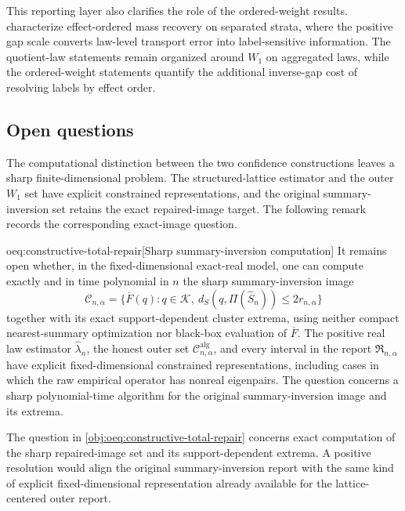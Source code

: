 This reporting layer also clarifies the role of the ordered-weight results.  characterize effect-ordered mass recovery on separated strata, where the positive gap scale converts law-level transport error into label-sensitive information. The quotient-law statements remain organized around \(W_1\) on aggregated laws, while the ordered-weight statements quantify the additional inverse-gap cost of resolving labels by effect order.

\subsection{Open questions}

The computational distinction between the two confidence constructions leaves a sharp finite-dimensional problem. The structured-lattice estimator and the outer \(W_1\) set have explicit constrained representations, and the original summary-inversion set retains the exact repaired-image target. The following remark records the corresponding exact-image question.

\begin{remarkv}{oeq:constructive-total-repair}[Sharp summary-inversion computation]
It remains open whether, in the fixed-dimensional exact-real model, one can compute exactly and in time polynomial in \(n\) the sharp summary-inversion image
\[
\mathcal C_{n,\alpha}
=
\{\overline F(q):q\in\mathcal K,\ d_S(q,\Pi(\widehat S_n))\le 2r_{n,\alpha}\}
\]
together with its exact support-dependent cluster extrema, using neither compact nearest-summary optimization nor black-box evaluation of \(\overline F\). The positive real law estimator \(\widehat\lambda_n\), the honest outer set \(\mathcal C^{\mathrm{alg}}_{n,\alpha}\), and every interval in the report \(\mathfrak R_{n,\alpha}\) have explicit fixed-dimensional constrained representations, including cases in which the raw empirical operator has nonreal eigenpairs. The question concerns a sharp polynomial-time algorithm for the original summary-inversion image and its extrema.
\end{remarkv}

The question in \cref{obj:oeq:constructive-total-repair} concerns exact computation of the sharp repaired-image set and its support-dependent extrema. A positive resolution would align the original summary-inversion report with the same kind of explicit fixed-dimensional representation already available for the lattice-centered outer report.

